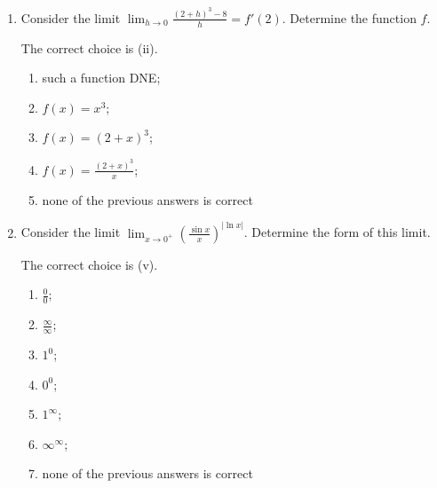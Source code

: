 \documentclass[nooutcomes,handout]{ximera}
\begin{document}
\begin{problem}
\begin{enumerate}
    \item
      Consider the limit $\lim_{h \to 0} \frac{(2+h)^3 - 8}{h} = f'(2)$.
      Determine the function $f$.
      \begin{freeResponse}
        The correct choice is (ii).
      \end{freeResponse}
      \begin{enumerate}
       \item
         such a function DNE;
       \item
         $f(x) = x^3$;
       \item
         $f(x) = (2 + x)^3$;
       \item
         $f(x) = \frac{(2+x)^3}{x}$;
       \item
         none of the previous answers is correct
      \end{enumerate}
      
    \item
      Consider the limit $\lim_{x \to 0^+} \left( \frac{\sin x}{x} \right)^{|\ln x|}$.
      Determine the form of this limit.
      \begin{freeResponse}
        The correct choice is (v).
      \end{freeResponse}
      \begin{enumerate}
       \item
         $\frac{0}{0}$;
       \item
         $\frac{\infty}{\infty}$;
       \item
         $1^0$;
       \item
         $0^0$;
       \item
         $1^\infty$;
       \item
         $\infty^\infty$;
       \item
         none of the previous answers is correct
      \end{enumerate}
  \end{enumerate}
\end{problem}
\end{document}
